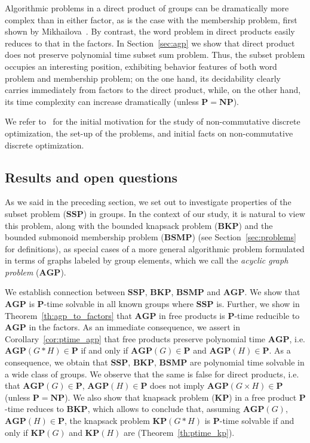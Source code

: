 \documentclass[10pt]{amsart}
\theoremstyle{definition}
\def\P{{\mathbf{P}}}
\def\NP{{\mathbf{NP}}}
\def\SSP{{\mathbf{SSP}}}
\def\BSMP{{\mathbf{BSMP}}}
\def\BKP{{\mathbf{BKP}}}
\def\KP{{\mathbf{KP}}}
\def\AGP{{\mathbf{AGP}}}
\begin{document}
Algorithmic problems in a direct product of groups can be dramatically more complex than in either factor, as is the case with the membership problem, first shown by Mikhailova~\cite{Mikhailova}. By contrast, the word problem in direct products easily reduces to that in the factors.
In Section~\ref{sec:agp} we show that direct product does not preserve polynomial time subset sum problem. Thus, the subset problem occupies an interesting position, exhibiting behavior features of both word problem and membership problem; on the one hand, its decidability clearly carries immediately from factors to the direct product, while, on the other hand, its time complexity can increase dramatically (unless $\P=\NP$). %


We refer to~\cite{Miasnikov-Nikolaev-Ushakov:2014a,Miasnikov-Nikolaev-Ushakov:2014b} for the initial motivation for the study of non-commutative discrete optimization, the set-up of the problems, and initial facts on non-commutative discrete optimization.

\subsection{Results and open questions}\label{sub:results}
As we said in the preceding section, we set out to investigate properties of the subset problem ($\SSP$) in groups. In the context of our study, it is natural to view this problem, along with the bounded knapsack problem ($\BKP$) and the bounded submonoid membership problem ($\BSMP$) (see Section~\ref{sec:problems} for definitions), as special cases of a more general algorithmic problem formulated in terms of graphs labeled by group elements, which we call the {\em acyclic graph problem} ($\AGP$).

We establish connection between $\SSP$, $\BKP$, $\BSMP$ and $\AGP$. We show that $\AGP$ is $\P$-time solvable in all known groups where $\SSP$ is. Further, we show in Theorem~\ref{th:agp_to_factors} that $\AGP$ in free products is $\P$-time reducible to $\AGP$ in the factors. As an immediate consequence, we assert in Corollary~\ref{cor:ptime_agp} that free products preserve polynomial time $\AGP$, i.e. $\AGP(G* H)\in\P$ if and only if $\AGP(G)\in\P$ and $\AGP(H)\in\P$. As a consequence, we obtain that $\SSP$, $\BKP$, $\BSMP$ are polynomial time solvable in a wide class of groups. We observe that the same is false for direct products, i.e. that $\AGP(G)\in\P$, $\AGP(H)\in\P$ does not imply $\AGP(G\times H)\in\P$ (unless $\P=\NP$). We also show that knapsack problem ($\KP$) in a free product $\P$-time reduces to $\BKP$, which allows to conclude that, assuming $\AGP(G)$, $\AGP(H)\in\P$, the knapsack problem $\KP(G*H)$ is $\P$-time solvable if and only if $\KP(G)$ and $\KP(H)$ are (Theorem~\ref{th:ptime_kp}).
\end{document}
